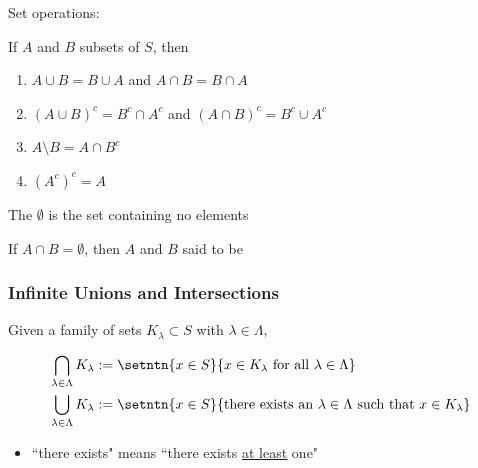 \begin{frame}

    Set operations:

    \vspace{1em}

        If $A$ and $B$ subsets of $S$, then
        \begin{enumerate}
            \item $A \cup B = B \cup A$ and $A \cap B = B \cap A$
            \item $(A \cup B)^c = B^c \cap A^c$ and $(A \cap B)^c = B^c \cup A^c$
            \item $A \setminus B = A \cap B^c$
            \item $(A^c)^c = A$
        \end{enumerate}

    \vspace{1em}

    The  $\emptyset$ is the set containing no elements

    If $A \cap B = \emptyset$, then $A$ and $B$ said to be 
    
\end{frame}

\begin{frame}
    \frametitle{Infinite Unions and Intersections}
    
    Given a family of sets $K_{\lambda} \subset S$ with $\lambda \in \Lambda$, 

    \vspace{-0.5em}
    
    \begin{align*}
        & \bigcap_{\lambda \in \Lambda} K_{\lambda} 
        := \setntn{x \in S}{x\in K_{\lambda}
            \textnormal{ for all } \lambda \in \Lambda}
        \\
        & \bigcup_{\lambda \in \Lambda} K_{\lambda}  
        := \setntn{x \in S}{\textnormal{there
            exists an } \lambda \in \Lambda \textnormal{ such that } x\in K_{\lambda} }
    \end{align*}
	

    \vspace{1em}

    \begin{itemize}
        \item ``there exists" means ``there exists \underline{at least} one"
    \end{itemize}

\end{frame}



